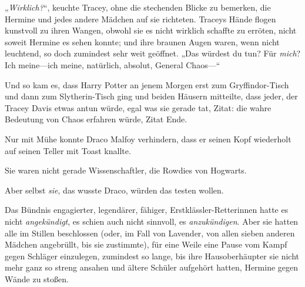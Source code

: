 „\emph{Wirklich?}“, keuchte Tracey, ohne die stechenden Blicke zu bemerken, die Hermine und jedes andere Mädchen auf sie richteten. Traceys Hände flogen kunstvoll zu ihren Wangen, obwohl sie es nicht wirklich schaffte zu erröten, nicht soweit Hermine es sehen konnte; und ihre braunen Augen waren, wenn nicht leuchtend, so doch zumindest sehr weit geöffnet. „Das würdest du tun? Für \emph{mich}? Ich meine—ich meine, natürlich, absolut, General Chaos—“

\later

Und so kam es, dass Harry Potter an jenem Morgen erst zum Gryffindor-Tisch und dann zum Slytherin-Tisch ging und beiden Häusern mitteilte, dass jeder, der Tracey Davis etwas antun würde, egal was sie gerade tat, Zitat: die wahre Bedeutung von Chaos erfahren würde, Zitat Ende.

Nur mit Mühe konnte Draco Malfoy verhindern, dass er seinen Kopf wiederholt auf seinen Teller mit Toast knallte.

Sie waren nicht gerade Wissenschaftler, die Rowdies von Hogwarts.

Aber selbst \emph{sie}, das wusste Draco, würden das testen wollen.

\later

Das Bündnis engagierter, legendärer, fähiger, Erstklässler-Retterinnen hatte es nicht \emph{angekündigt}, es schien auch nicht sinnvoll, es \emph{anzukündigen}. Aber sie hatten alle im Stillen beschlossen (oder, im Fall von Lavender, von allen sieben anderen Mädchen angebrüllt, bis sie zustimmte), für eine Weile eine Pause vom Kampf gegen Schläger einzulegen, zumindest so lange, bis ihre Hausoberhäupter sie nicht mehr ganz so streng ansahen und ältere Schüler aufgehört hatten, Hermine gegen Wände zu stoßen.

